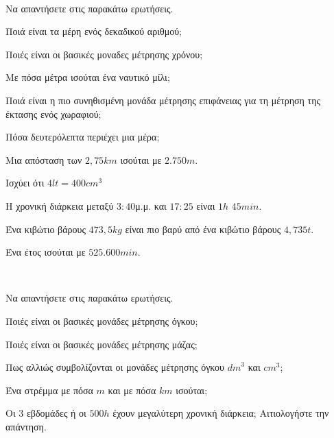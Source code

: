 \documentclass[internet]{diag-xelatex}
\begin{document}
\thewria
\begin{thema}
\item \mbox{}\\\vspace{-7mm}
\begin{erwthma}
\item Να απαντήσετε στις παρακάτω ερωτήσεις.
\begin{rlist}
\item Ποιά είναι τα μέρη ενός δεκαδικού αριθμού;
\item Ποιές είναι οι βασικές μοναδες μέτρησης χρόνου;
\item Με πόσα μέτρα ισούται ένα ναυτικό μίλι;
\item Ποιά είναι η πιο συνηθισμένη μονάδα μέτρησης επιφάνειας για τη μέτρηση της έκτασης ενός χωραφιού;
\item Πόσα δευτερόλεπτα περιέχει μια μέρα;
\end{rlist}
\item \swstolathos
\begin{rlist}
\item Μια απόσταση των $ 2{,}75\si{km} $ ισούται με $ 2.750\si{m} $.
\item Ισχύει ότι $ 4\si{lt}=400\si{cm}^3 $
\item Η χρονική διάρκεια μεταξύ $ 3:40 $μ.μ. και $ 17:25 $ είναι $ 1\si{h} $  $ 45\si{min} $.
\item Ένα κιβώτιο βάρους $ 473{,}5\si{kg} $ είναι πιο βαρύ από ένα κιβώτιο βάρους $ 4{,}735\si{t} $.
\item Ένα έτος ισούται με $ 525.600\si{min} $.
\end{rlist}
\end{erwthma}
\item \mbox{}\\\vspace{-7mm}
\begin{erwthma}
\item Να απαντήσετε στις παρακάτω ερωτήσεις.
\begin{rlist}
\item Ποιές είναι οι βασικές μονάδες μέτρησης όγκου;
\item Ποιές είναι οι βασικές μονάδες μέτρησης μάζας;
\item Πως αλλιώς συμβολίζονται οι μονάδες μέτρησης όγκου $ \si{dm}^3 $ και $ \si{cm}^3 $;
\item Ένα στρέμμα με πόσα $ \si{m} $ και με πόσα $ \si{km} $ ισούται;
\item Οι 3 εβδομάδες ή οι $ 500\si{h} $ έχουν μεγαλύτερη χρονική διάρκεια; Αιτιολογήστε την απάντηση.

\end{rlist}
\end{erwthma}
\end{thema}
\end{document}
